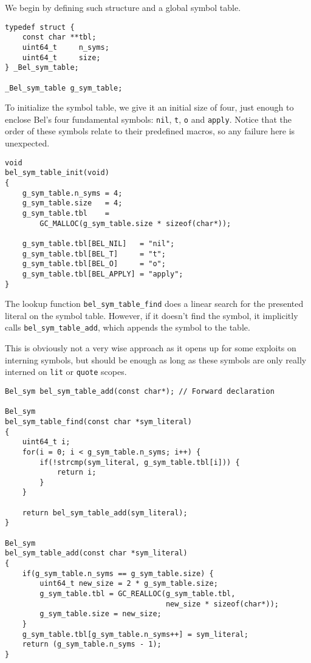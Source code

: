 \documentclass[openright,a4paper,twoside,12pt]{memoir}
\begin{document}
We begin by defining such structure and a global symbol table.

\begin{verbatim}
typedef struct {
    const char **tbl;
    uint64_t     n_syms;
    uint64_t     size;
} _Bel_sym_table;

_Bel_sym_table g_sym_table;
\end{verbatim}

To initialize the symbol table, we give it an initial size of four,
just enough to enclose Bel's four fundamental symbols: \texttt{nil}, \texttt{t}, \texttt{o} and
\texttt{apply}. Notice that the order of these symbols relate to their
predefined macros, so any failure here is unexpected.

\begin{verbatim}
void
bel_sym_table_init(void)
{
    g_sym_table.n_syms = 4;
    g_sym_table.size   = 4;
    g_sym_table.tbl    =
        GC_MALLOC(g_sym_table.size * sizeof(char*));

    g_sym_table.tbl[BEL_NIL]   = "nil";
    g_sym_table.tbl[BEL_T]     = "t";
    g_sym_table.tbl[BEL_O]     = "o";
    g_sym_table.tbl[BEL_APPLY] = "apply";
}
\end{verbatim}

The lookup function \texttt{bel\_sym\_table\_find} does a linear search for the
presented literal on the symbol table. However, if it doesn't find the
symbol, it implicitly calls \texttt{bel\_sym\_table\_add}, which appends the
symbol to the table.

This is obviously not a very wise approach as it opens up for some
exploits on interning symbols, but should be enough as long as these
symbols are only really interned on \texttt{lit} or \texttt{quote} scopes.

\begin{verbatim}
Bel_sym bel_sym_table_add(const char*); // Forward declaration

Bel_sym
bel_sym_table_find(const char *sym_literal)
{
    uint64_t i;
    for(i = 0; i < g_sym_table.n_syms; i++) {
        if(!strcmp(sym_literal, g_sym_table.tbl[i])) {
            return i;
        }
    }

    return bel_sym_table_add(sym_literal);
}

Bel_sym
bel_sym_table_add(const char *sym_literal)
{
    if(g_sym_table.n_syms == g_sym_table.size) {
        uint64_t new_size = 2 * g_sym_table.size;
        g_sym_table.tbl = GC_REALLOC(g_sym_table.tbl,
                                     new_size * sizeof(char*));
        g_sym_table.size = new_size;
    }
    g_sym_table.tbl[g_sym_table.n_syms++] = sym_literal;
    return (g_sym_table.n_syms - 1);
}
\end{verbatim}
\end{document}
